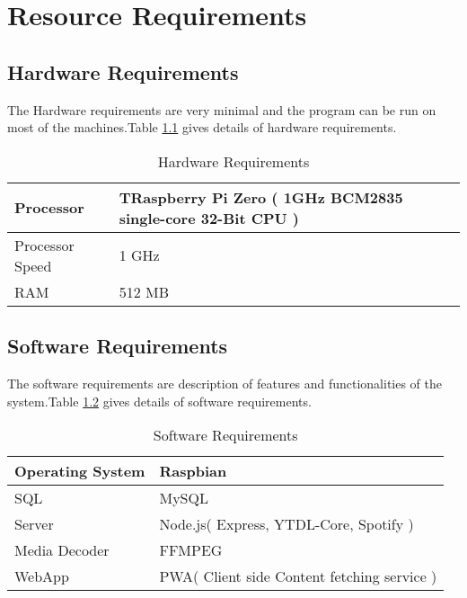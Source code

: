 \chapter{Resource Requirements}
\section{Hardware Requirements}
The Hardware requirements are very minimal and the program can be run on most of the machines.Table \ref{T1} gives details of hardware requirements. 
\begin{table}[h!]
\caption{Hardware Requirements}
\label{T1}
\begin{center}
\begin{tabular}{ |p{4cm}|p{8cm}| }
\hline
 Processor & TRaspberry Pi Zero ( 1GHz BCM2835 single-core 32-Bit CPU ) \\ 
\hline
Processor Speed  & 1 GHz \\ 
\hline
RAM & 512 MB \\ 
\hline

\end{tabular}
\end{center}
\end{table}
\section{Software Requirements} 
The software requirements are description of features and functionalities of the system.Table \ref{T2} gives details of software requirements. \begin{table}[h!]
\caption{Software Requirements}
\label{T2}
\begin{center}
\begin{tabular}{ |p{4cm}|p{8cm}| }
\hline
Operating System & Raspbian \\ 
\hline
SQL & MySQL \\
\hline
Server & Node.js( Express, YTDL-Core, Spotify ) \\ 
\hline
Media Decoder & FFMPEG \\
\hline
WebApp & PWA( Client side Content fetching service ) \\
\hline
\end{tabular}
\end{center}
\end{table}